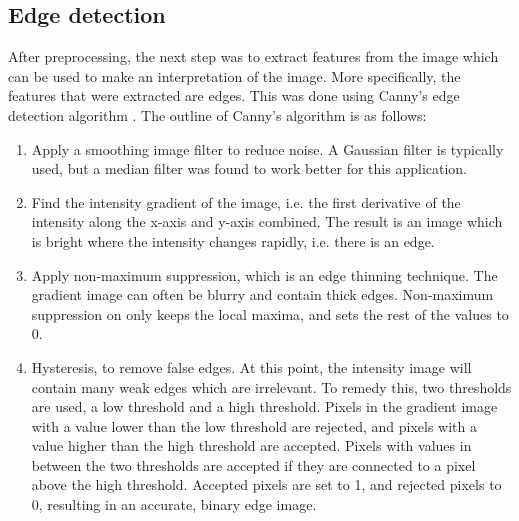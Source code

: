\subsection{Edge detection} \label{method:edge_detection}
After preprocessing, the next step was to extract features from the image which can be used to make an interpretation of the image.
More specifically, the features that were extracted are edges. 
This was done using Canny's edge detection algorithm \cite{canny}. %
The outline of Canny's algorithm is as follows:
\begin{enumerate}
	\item Apply a smoothing image filter to reduce noise. A Gaussian filter is typically used, but a median filter was found to work better for this application.
	\item Find the intensity gradient of the image, i.e. the first derivative of the intensity along the x-axis and y-axis combined. The result is an image which is bright where the intensity changes rapidly, i.e. there is an edge.
	\item Apply non-maximum suppression, which is an edge thinning technique. The gradient image can often be blurry and contain thick edges. Non-maximum suppression on only keeps the local maxima, and sets the rest of the values to 0.
	\item Hysteresis, to remove false edges. At this point, the intensity image will contain many weak edges which are irrelevant. To remedy this, two thresholds are used, a low threshold and a high threshold. Pixels in the gradient image with a value lower than the low threshold are rejected, and pixels with a value  higher than the high threshold are accepted. Pixels with values in between the two thresholds are accepted if they are connected to a pixel above the high threshold. Accepted pixels are set to 1, and rejected pixels to 0, resulting in an accurate, binary edge image.
\end{enumerate}

